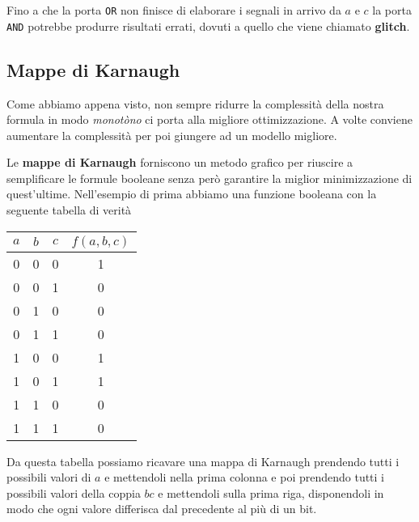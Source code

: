 Fino a che la porta \verb|OR| non finisce di elaborare i segnali in arrivo da $a$ e $c$ la porta
\verb|AND| potrebbe produrre risultati errati, dovuti a quello che viene chiamato \textbf{glitch}.

\subsection{Mappe di Karnaugh}
Come abbiamo appena visto, non sempre ridurre la complessità della nostra formula in modo
\emph{monotòno} ci porta alla migliore ottimizzazione. A volte conviene aumentare la complessità
per poi giungere ad un modello migliore.

Le \textbf{mappe di Karnaugh} forniscono un metodo grafico per riuscire a semplificare le formule
booleane senza però garantire la miglior minimizzazione di quest'ultime. Nell'esempio di prima
abbiamo una funzione booleana con la seguente tabella di verità
\begin{center}
	\begin{tabular}{c c c | c}
		$a$ & $b$ & $c$ & $f(a,b,c)$ \\ \hline
		0   & 0   & 0   & 1          \\
		0   & 0   & 1   & 0          \\
		0   & 1   & 0   & 0          \\
		0   & 1   & 1   & 0          \\
		1   & 0   & 0   & 1          \\
		1   & 0   & 1   & 1          \\
		1   & 1   & 0   & 0          \\
		1   & 1   & 1   & 0
	\end{tabular}
\end{center}
Da questa tabella possiamo ricavare una mappa di Karnaugh prendendo tutti i possibili valori di $a$
e mettendoli nella prima colonna e poi prendendo tutti i possibili valori della coppia $bc$ e
mettendoli sulla prima riga, disponendoli in modo che ogni valore differisca dal precedente al più
di un bit.

